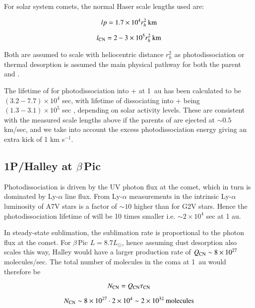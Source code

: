 \documentclass{aa}
\newcommand{\kms}{km s$^{-1}$}
\newcommand{\bp}{$\beta$\,Pic}
\begin{document}
For solar system comets, the normal Haser scale lengths used \citep{Cochran86,AHearn1995} are:

$$lp=1.7\times10^4r_h^2\:{\rm km}$$

$$l_{\ce{CN}}=2-3\times10^5r_h^2\:{\rm km}$$

Both are assumed to scale with heliocentric distance $r_h^2$ as photodissociation or thermal desorption is assumed the main physical pathway for both the parent and .

The lifetime of  for photodissociation into + at 1~au has been calculated to be $(3.2-7.7)\times10^4$ sec, with lifetime of  dissociating into + being $(1.3-3.1)\times10^5$ sec \citep{Huebner92}, depending on solar activity levels.
%
These are consistent with the measured scale lengths above if the parents of  are ejected at $\sim 0.5$ km/sec, and we take into account the excess photodissociation energy giving  an extra kick of 1 \kms{}. 

\subsection{1P/Halley at \bp{}}


Photodissociation is  driven by the UV photon flux at the comet, which in turn is dominated by Ly-$\alpha$ line flux. From Ly-$\alpha$ measurements in \citet{Landsman93} the intrinsic Ly-$\alpha$ luminosity of A7V stars is a factor of $\sim10$ higher than for G2V stars.
%
Hence the photodissociation lifetime of  will be 10 times smaller i.e. $\sim 2\times10^4$ sec at 1 au.

In steady-state sublimation, the sublimation rate is proportional to the photon flux at the comet. For \bp{} $L=8.7L_\odot$, hence assuming dust desorption also scales this way, Halley would have a larger  production rate of $Q_{\ce{CN}}\sim 8\times10^{27}$ molecules/sec.
%
The total number of  molecules in the coma at 1~au would therefore be

$$N_{\ce{CN}}=Q_{\ce{CN}} \tau_{\ce{CN}}$$

$$N_{\ce{CN}}\sim 8\times10^{27} \cdot  2\times10^4 \sim 2\times10^{32}\:{\rm molecules}$$

\end{document}
